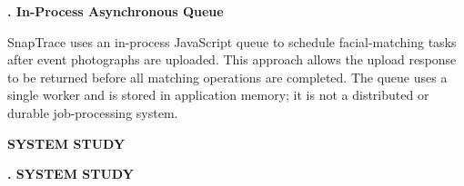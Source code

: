 \vspace{0.4cm}
{ \noindent \bfseries \fontsize{14pt}{15pt}. In-Process Asynchronous Queue
    \par}
\vspace{0.2cm}
\par \noindent SnapTrace uses an in-process JavaScript queue to schedule facial-matching tasks after event photographs are uploaded. This approach allows the upload response to be returned before all matching operations are completed. The queue uses a single worker and is stored in application memory; it is not a distributed or durable job-processing system.
\clearpage

\begin{center}
    \vspace*{\fill}
    \fontsize{28}{28}\selectfont \textbf{SYSTEM STUDY}
    \vspace*{\fill}
\end{center}
\clearpage


\vspace*{0.5cm}
{ \noindent \bfseries \fontsize{14pt}{15pt}. SYSTEM STUDY
    \par}
\vspace{0.4cm}


